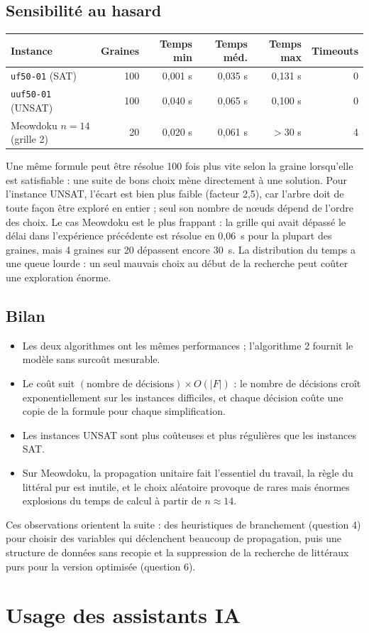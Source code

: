\documentclass[11pt,a4paper]{article}
\begin{document}
\subsection{Sensibilité au hasard}

\begin{center}
\begin{tabular}{lrrrrr}
  Instance & Graines & Temps min & Temps méd. & Temps max & Timeouts \\
  \hline
  \texttt{uf50-01} (SAT)    & 100 & 0,001 s & 0,035 s & 0,131 s & 0 \\
  \texttt{uuf50-01} (UNSAT) & 100 & 0,040 s & 0,065 s & 0,100 s & 0 \\
  Meowdoku $n=14$ (grille 2) & 20 & 0,020 s & 0,061 s & $>30$ s & 4 \\
\end{tabular}
\end{center}

Une même formule peut être résolue 100 fois plus vite selon la graine
lorsqu'elle est satisfiable : une suite de bons choix mène directement à une
solution. Pour l'instance UNSAT, l'écart est bien plus faible (facteur 2,5),
car l'arbre doit de toute façon être exploré en entier ; seul son nombre de
n\oe{}uds dépend de l'ordre des choix. Le cas Meowdoku est le plus frappant :
la grille qui avait dépassé le délai dans l'expérience précédente est résolue
en 0,06~s pour la plupart des graines, mais 4 graines sur 20 dépassent
encore 30~s. La distribution du temps a une \og queue lourde \fg{} : un seul
mauvais choix au début de la recherche peut coûter une exploration énorme.

\subsection{Bilan}

\begin{itemize}
  \item Les deux algorithmes ont les mêmes performances ; l'algorithme 2
    fournit le modèle sans surcoût mesurable.
  \item Le coût suit $(\text{nombre de décisions}) \times O(|F|)$ : le
    nombre de décisions croît exponentiellement sur les instances
    difficiles, et chaque décision coûte une copie de la formule pour chaque
    simplification.
  \item Les instances UNSAT sont plus coûteuses et plus régulières que les
    instances SAT.
  \item Sur Meowdoku, la propagation unitaire fait l'essentiel du travail, la
    règle du littéral pur est inutile, et le choix aléatoire provoque de
    rares mais énormes explosions du temps de calcul à partir de $n\approx 14$.
\end{itemize}
Ces observations orientent la suite : des heuristiques de branchement
(question 4) pour choisir des variables qui déclenchent beaucoup de
propagation, puis une structure de données sans recopie et la suppression de
la recherche de littéraux purs pour la version optimisée (question 6).

\section{Usage des assistants IA}

\end{document}
